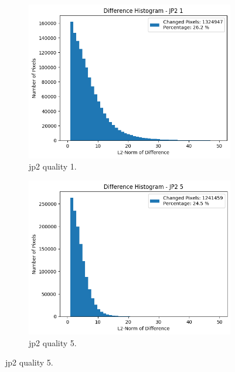 \begin{figure}[htb]
    \centering
        \begin{subfigure}[b]{0.49\textwidth}
            \centering
            \includegraphics[width=\textwidth]{doc/thesis/0_figures/compare_quality/set1/jp2_1_diff_histogram.png}
            \caption{\gls{jp2} quality 1.}
            \label{fig:img_quality_histogram_1}
        \end{subfigure}
        \begin{subfigure}[b]{0.49\textwidth}
            \centering
            \includegraphics[width=\textwidth]{doc/thesis/0_figures/compare_quality/set1/jp2_5_diff_histogram.png}
            \caption{\gls{jp2} quality 5.}

\end{subfigure}
\end{figure}
